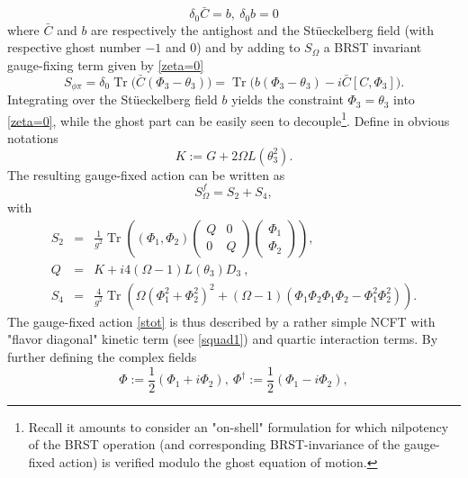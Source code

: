 \documentclass[a4paper,11pt,twoside]{article}
\numberwithin{equation}{section}
\DeclareMathOperator{\tr}{Tr}
\theoremstyle{nonumberplain}
\newcounter{and}
\begin{document}
%
\begin{equation}
\delta_0{\bar{C}}=b,\ \delta_0b=0\label{contractible-brs}
\end{equation}
%
where ${\bar{C}}$ and $b$ are respectively the antighost and the St\"ueckelberg field (with respective ghost number $-1$ and $0$) and by adding to $S_\Omega$ a BRST invariant gauge-fixing term given by \eqref{zeta=0}%
%
\begin{equation}
S_{\phi\pi}=\delta_0\tr\big({\bar{C}}(\Phi_3-\theta_3) \big)=\tr\big(b(\Phi_3-\theta_3)-i{\bar{C}}[C,\Phi_3]\big)\label{gauge-fix}.
\end{equation}
%
Integrating over the St\"ueckelberg field $b$ yields the constraint $\Phi_3=\theta_3$ into \eqref{zeta=0}, while the ghost part can be easily seen to decouple{\footnote{Recall it amounts to consider an "on-shell" formulation for which nilpotency of the BRST operation (and corresponding BRST-invariance of the gauge-fixed action) is verified modulo the ghost equation of motion.}}. Define in obvious notations%
%
\begin{equation}
K:=G+2\Omega L(\theta_3^2)\label{operator-K}.
\end{equation}
%
The resulting gauge-fixed action can be written as%
%
\begin{equation}
S^f_\Omega=S_2+S_4\label{stot},
\end{equation}
with%
\begin{eqnarray}
S_2 &=& \frac{1}{g^2} \tr \left((\Phi_1,\Phi_2)
\begin{pmatrix}
Q&0\\
0&Q
\end{pmatrix} 
\begin{pmatrix}
\Phi_1\\
\Phi_2
\end{pmatrix} 
\right) , \nonumber \\
Q &=& K + i 4 (\Omega-1) L(\theta_3) D_3 \ , \label{squad1} \\[5pt]
S_4 &=& \frac{4}{g^2} \tr \left( \Omega (\Phi_1^2 + \Phi_2^2)^2 + (\Omega-1)(\Phi_1\Phi_2\Phi_1\Phi_2 - \Phi_1^2\Phi_2^2) \right) . \label{squart}
\end{eqnarray}
%
The gauge-fixed action \eqref{stot} is thus described by a rather simple NCFT with "flavor diagonal" kinetic term (see \eqref{squad1}) and quartic interaction terms. By further defining the complex fields%
%
\begin{equation}
\Phi:=\frac{1}{2}(\Phi_1+i\Phi_2),\ \Phi^\dag:=\frac{1}{2}(\Phi_1-i\Phi_2),
\end{equation}
\end{document}
